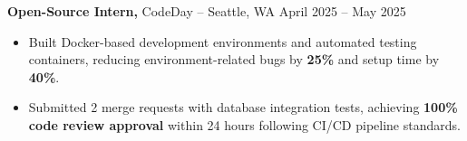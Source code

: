 \documentclass[11pt]{article}
\begin{document}
\textbf{Open-Source Intern,} {CodeDay} -- Seattle, WA \hfill April 2025 -- May 2025
\vspace{-9pt}
\begin{itemize}
  \item Built Docker-based development environments and automated testing containers, reducing environment-related bugs by \textbf{25\%} and setup time by \textbf{40\%}.
  \item Submitted 2 merge requests with database integration tests, achieving \textbf{100\% code review approval} within 24 hours following CI/CD pipeline standards.
\end{itemize}

\end{document}
